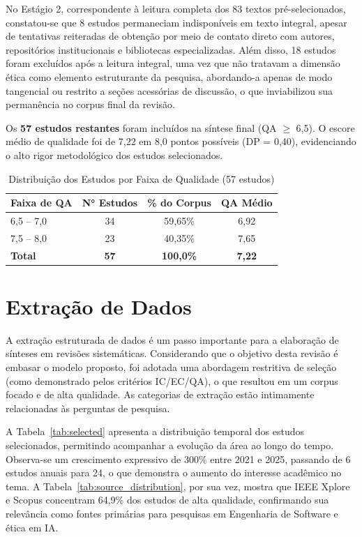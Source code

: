 No Estágio 2, correspondente à leitura completa dos 83 textos pré-selecionados, constatou-se que 8 estudos permaneciam indisponíveis em texto integral, apesar de tentativas reiteradas de obtenção por meio de contato direto com autores, repositórios institucionais e bibliotecas especializadas. Além disso, 18 estudos foram excluídos após a leitura integral, uma vez que não tratavam a dimensão ética como elemento estruturante da pesquisa, abordando-a apenas de modo tangencial ou restrito a seções acessórias de discussão, o que inviabilizou sua permanência no corpus final da revisão.

Os \textbf{57 estudos restantes} foram incluídos na síntese final (QA $\geq$ 6,5). O escore médio de qualidade foi de 7,22 em 8,0 pontos possíveis (DP = 0,40), evidenciando o alto rigor metodológico dos estudos selecionados.

\begin{table}[htbp]
\centering
\caption{Distribuição dos Estudos por Faixa de Qualidade (57 estudos)}
\label{tab:qa_distribution}
\footnotesize
\begin{tabular}{lccc}
\toprule
\textbf{Faixa de QA} & \textbf{N° Estudos} & \textbf{\% do Corpus} & \textbf{QA Médio} \\
\midrule
6,5 -- 7,0 & 34 & 59,65\% & 6,92 \\
7,5 -- 8,0 & 23 & 40,35\% & 7,65 \\
\midrule
\textbf{Total} & \textbf{57} & \textbf{100,0\%} & \textbf{7,22} \\
\bottomrule
\end{tabular}
\end{table}



\section{Extração de Dados}\label{sec:data_extraction}

A extração estruturada de dados é um passo importante para a elaboração de sínteses em revisões sistemáticas. Considerando que o objetivo desta revisão é embasar o modelo proposto, foi adotada uma abordagem restritiva de seleção (como demonstrado pelos critérios IC/EC/QA), o que resultou em um corpus focado e de alta qualidade. As categorias de extração estão intimamente relacionadas às perguntas de pesquisa.

A Tabela~\ref{tab:selected} apresenta a distribuição temporal dos estudos selecionados, permitindo acompanhar a evolução da área ao longo do tempo. Observa-se um crescimento expressivo de 300\% entre 2021 e 2025, passando de 6 estudos anuais para 24, o que demonstra o aumento do interesse acadêmico no tema. A Tabela~\ref{tab:source_distribution}, por sua vez, mostra que IEEE Xplore e Scopus concentram 64,9\% dos estudos de alta qualidade, confirmando sua relevância como fontes primárias para pesquisas em Engenharia de Software e ética em IA.


